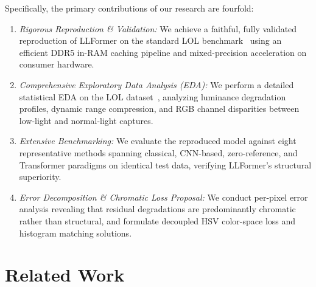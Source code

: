 \documentclass[conference]{IEEEtran}
\begin{document}
Specifically, the primary contributions of our research are fourfold:
\begin{enumerate}
    \item \textit{Rigorous Reproduction \& Validation:} We achieve a faithful, fully validated reproduction of LLFormer on the standard LOL benchmark~\cite{wei2018retinexnet} using an efficient DDR5 in-RAM caching pipeline and mixed-precision acceleration on consumer hardware.
    \item \textit{Comprehensive Exploratory Data Analysis (EDA):} We perform a detailed statistical EDA on the LOL dataset~\cite{wei2018retinexnet}, analyzing luminance degradation profiles, dynamic range compression, and RGB channel disparities between low-light and normal-light captures.
    \item \textit{Extensive Benchmarking:} We evaluate the reproduced model against eight representative methods spanning classical, CNN-based, zero-reference, and Transformer paradigms on identical test data, verifying LLFormer's structural superiority.
    \item \textit{Error Decomposition \& Chromatic Loss Proposal:} We conduct per-pixel error analysis revealing that residual degradations are predominantly chromatic rather than structural, and formulate decoupled HSV color-space loss and histogram matching solutions.
\end{enumerate}

\section{Related Work}
\label{sec:related}
\end{document}
